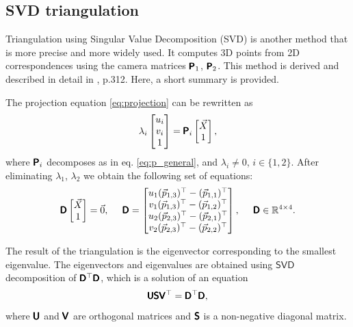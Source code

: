 \subsection{SVD triangulation}
\label{sec:svdtriang}
Triangulation using Singular Value Decomposition (SVD) is another method that is more precise and more widely used.
It computes 3D points from 2D correspondences using the camera matrices $\pmb{\mathsf{P}}_1$, $\pmb{\mathsf{P}}_2$. 
This method is derived and described in detail in \cite{hartley_zisserman_2004}, p.312. Here, a short summary is provided.

The projection equation \eqref{eq:projection} can be rewritten as
\begin{equation}
    \lambda_i \begin{bmatrix} 
        u_i \\ v_i \\ 1 \end{bmatrix} = \pmb{\mathsf{P}}_i
    \begin{bmatrix} \vec{X} \\ 1
    \end{bmatrix},
\end{equation} 
where $\pmb{\mathsf{P}}_i$ decomposes as in eq. \eqref{eq:p_general}, and $\lambda_i \neq 0$, $i \in \{1, 2\}$.
After eliminating $\lambda_1$, $\lambda_2$ we obtain the following set of equations:
\begin{equation}
    \pmb{\mathsf{D}} \begin{bmatrix} \vec{X} \\ 1 \end{bmatrix} = \vec{0}, \;\;\;\;\;
    \pmb{\mathsf{D}} = \begin{bmatrix}
        u_1 (\vec{p}_{1, 3})^\top - (\vec{p}_{1, 1})^\top \\
        v_1 (\vec{p}_{1, 3})^\top - (\vec{p}_{1, 2})^\top \\
        u_2 (\vec{p}_{2, 3})^\top - (\vec{p}_{2, 1})^\top \\
        v_2 (\vec{p}_{2, 3})^\top - (\vec{p}_{2, 2})^\top \\
    \end{bmatrix}, \;\;\;\;\; \pmb{\mathsf{D}} \in \mathbb{R}^{4 \times 4}.
\end{equation}

The result of the triangulation is the eigenvector corresponding to the smallest eigenvalue.
The eigenvectors and eigenvalues are obtained using $\mathsf{SVD}$ decomposition of $\pmb{\mathsf{D}}^\top\pmb{\mathsf{D}}$, which is a solution of an equation
\begin{equation}
    \pmb{\mathsf{U}}\pmb{\mathsf{S}}\pmb{\mathsf{V}}^\top = \pmb{\mathsf{D}}^\top\pmb{\mathsf{D}},
\end{equation}
where $\pmb{\mathsf{U}}$ and $\pmb{\mathsf{V}}$ are orthogonal matrices and $\pmb{\mathsf{S}}$ is a non-negative diagonal matrix.

